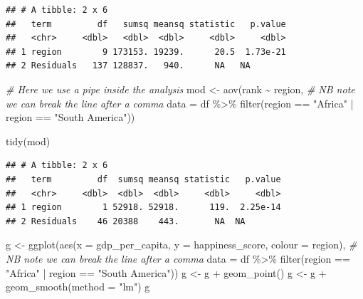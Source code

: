 \documentclass[]{article}
\newenvironment{Shaded}{\begin{snugshade}}{\end{snugshade}}
\newcommand{\AttributeTok}[1]{\textcolor[rgb]{0.77,0.63,0.00}{#1}}
\newcommand{\CommentTok}[1]{\textcolor[rgb]{0.56,0.35,0.01}{\textit{#1}}}
\newcommand{\FunctionTok}[1]{\textcolor[rgb]{0.00,0.00,0.00}{#1}}
\newcommand{\NormalTok}[1]{#1}
\newcommand{\OtherTok}[1]{\textcolor[rgb]{0.56,0.35,0.01}{#1}}
\newcommand{\SpecialCharTok}[1]{\textcolor[rgb]{0.00,0.00,0.00}{#1}}
\newcommand{\StringTok}[1]{\textcolor[rgb]{0.31,0.60,0.02}{#1}}
\begin{document}
\begin{verbatim}
## # A tibble: 2 x 6
##   term         df   sumsq meansq statistic   p.value
##   <chr>     <dbl>   <dbl>  <dbl>     <dbl>     <dbl>
## 1 region        9 173153. 19239.      20.5  1.73e-21
## 2 Residuals   137 128837.   940.      NA   NA
\end{verbatim}

\begin{Shaded}
\begin{Highlighting}[]
\CommentTok{\# Here we use a pipe inside the analysis}
\NormalTok{mod }\OtherTok{\textless{}{-}} \FunctionTok{aov}\NormalTok{(rank }\SpecialCharTok{\textasciitilde{}}\NormalTok{ region, }\CommentTok{\# NB note we can break the line after a comma}
           \AttributeTok{data =}\NormalTok{ df }\SpecialCharTok{\%\textgreater{}\%} \FunctionTok{filter}\NormalTok{(region }\SpecialCharTok{==} \StringTok{"Africa"} \SpecialCharTok{|}\NormalTok{ region }\SpecialCharTok{==} \StringTok{"South America"}\NormalTok{))}

\FunctionTok{tidy}\NormalTok{(mod)}
\end{Highlighting}
\end{Shaded}

\begin{verbatim}
## # A tibble: 2 x 6
##   term         df  sumsq meansq statistic   p.value
##   <chr>     <dbl>  <dbl>  <dbl>     <dbl>     <dbl>
## 1 region        1 52918. 52918.      119.  2.25e-14
## 2 Residuals    46 20388    443.       NA  NA
\end{verbatim}

\begin{Shaded}
\begin{Highlighting}[]
\NormalTok{g }\OtherTok{\textless{}{-}} \FunctionTok{ggplot}\NormalTok{(}\FunctionTok{aes}\NormalTok{(}\AttributeTok{x =}\NormalTok{ gdp\_per\_capita, }\AttributeTok{y =}\NormalTok{ happiness\_score, }\AttributeTok{colour =}\NormalTok{ region), }\CommentTok{\# NB note we can break the line after a comma}
            \AttributeTok{data =}\NormalTok{ df }\SpecialCharTok{\%\textgreater{}\%} \FunctionTok{filter}\NormalTok{(region }\SpecialCharTok{==} \StringTok{"Africa"} \SpecialCharTok{|}\NormalTok{ region }\SpecialCharTok{==} \StringTok{"South America"}\NormalTok{))}
\NormalTok{g }\OtherTok{\textless{}{-}}\NormalTok{ g }\SpecialCharTok{+} \FunctionTok{geom\_point}\NormalTok{()}
\NormalTok{g }\OtherTok{\textless{}{-}}\NormalTok{ g }\SpecialCharTok{+} \FunctionTok{geom\_smooth}\NormalTok{(}\AttributeTok{method =} \StringTok{"lm"}\NormalTok{)}
\NormalTok{g}
\end{Highlighting}
\end{Shaded}
\end{document}
